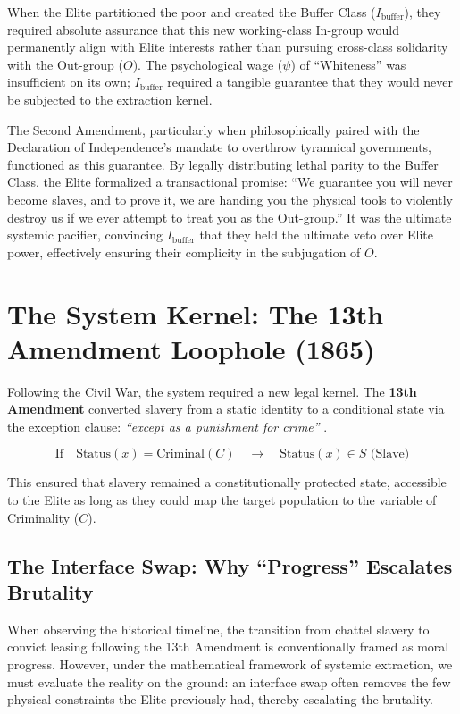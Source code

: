 \documentclass[12pt,openany]{book}
\begin{document}
When the Elite partitioned the poor and created the Buffer Class ($I_{\text{buffer}}$), they required absolute assurance that this new working-class In-group would permanently align with Elite interests rather than pursuing cross-class solidarity with the Out-group ($O$). The psychological wage ($\psi$) of ``Whiteness'' was insufficient on its own; $I_{\text{buffer}}$ required a tangible guarantee that they would never be subjected to the extraction kernel.

The Second Amendment, particularly when philosophically paired with the Declaration of Independence's mandate to overthrow tyrannical governments, functioned as this guarantee. By legally distributing lethal parity to the Buffer Class, the Elite formalized a transactional promise: ``We guarantee you will never become slaves, and to prove it, we are handing you the physical tools to violently destroy us if we ever attempt to treat you as the Out-group.'' It was the ultimate systemic pacifier, convincing $I_{\text{buffer}}$ that they held the ultimate veto over Elite power, effectively ensuring their complicity in the subjugation of $O$.

\section{The System Kernel: The 13th Amendment Loophole (1865)}
Following the Civil War, the system required a new legal kernel. The \textbf{13th Amendment} converted slavery from a static identity to a conditional state via the exception clause: \textit{``except as a punishment for crime''} \cite{alexander, blackmon, thirteenth}.

\[
\text{If} \quad \text{Status}(x) = \text{Criminal}(C) \quad \rightarrow \quad \text{Status}(x) \in S \text{ (Slave)}
\]

This ensured that slavery remained a constitutionally protected state, accessible to the Elite as long as they could map the target population to the variable of Criminality ($C$).

\subsection{The Interface Swap: Why ``Progress'' Escalates Brutality}

When observing the historical timeline, the transition from chattel slavery to convict leasing following the 13th Amendment is conventionally framed as moral progress. However, under the mathematical framework of systemic extraction, we must evaluate the reality on the ground: an interface swap often removes the few physical constraints the Elite previously had, thereby escalating the brutality.
\end{document}
